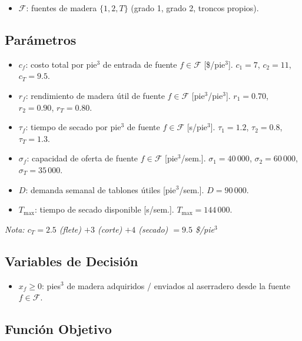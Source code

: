 \documentclass[12pt,a4paper]{article}
\begin{document}
\begin{conjbox}
\begin{itemize}[leftmargin=1.5em]
  \item $\mathcal{F}$: fuentes de madera $\{1, 2, T\}$ (grado 1, grado 2, troncos propios).
\end{itemize}
\end{conjbox}

\subsection{Parámetros}

\begin{parambox}
\begin{itemize}[leftmargin=1.5em]
  \item $c_f$: costo total por pie$^3$ de entrada de fuente $f \in \mathcal{F}$ [\$/pie$^3$]. $c_1=7$, $c_2=11$, $c_T=9.5$.
  \item $r_f$: rendimiento de madera útil de fuente $f \in \mathcal{F}$ [pie$^3$/pie$^3$]. $r_1=0.70$, $r_2=0.90$, $r_T=0.80$.
  \item $\tau_f$: tiempo de secado por pie$^3$ de fuente $f \in \mathcal{F}$ [s/pie$^3$]. $\tau_1=1.2$, $\tau_2=0.8$, $\tau_T=1.3$.
  \item $\sigma_f$: capacidad de oferta de fuente $f \in \mathcal{F}$ [pie$^3$/sem.]. $\sigma_1=40\,000$, $\sigma_2=60\,000$, $\sigma_T=35\,000$.
  \item $D$: demanda semanal de tablones útiles [pie$^3$/sem.]. $D = 90\,000$.
  \item $T_{\max}$: tiempo de secado disponible [s/sem.]. $T_{\max} = 144\,000$.
\end{itemize}
\textit{Nota: $c_T = 2.5$ (flete) $+ 3$ (corte) $+ 4$ (secado) $= 9.5$ \$/pie$^3$}
\end{parambox}

\subsection{Variables de Decisión}

\begin{varbox}
\begin{itemize}[leftmargin=1.5em]
  \item $x_f \geq 0$: pies$^3$ de madera adquiridos / enviados al aserradero desde la fuente $f \in \mathcal{F}$.
\end{itemize}
\end{varbox}

\subsection{Función Objetivo}
\end{document}
